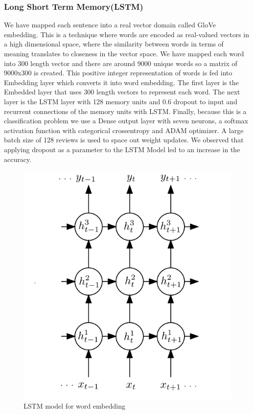 \documentclass[conference]{IEEEtran}
\numberwithin{equation}{section}
\numberwithin{figure}{section}
\numberwithin{table}{section}
\begin{document}
\subsubsection {Long Short Term Memory(LSTM)\cite{lstm}}
We have mapped each sentence into a real vector domain called GloVe embedding. This is a technique where words are encoded as real-valued vectors in a high dimensional space, where the similarity between words in terms of meaning translates to closeness in the vector space.
We have mapped each word into 300 length vector and there are around 9000 unique words so a matrix of 9000x300 is created. This positive integer representation of words is fed into Embedding layer which converts it into word embedding.
The first layer is the Embedded layer that uses 300 length vectors to represent each word. The next layer is the LSTM layer with 128 memory units and 0.6 dropout to input and recurrent connections of the memory units with LSTM. Finally, because this is a classification problem we use a Dense output layer with seven neurons, a softmax activation function with categorical crossentropy and ADAM optimizer. A large batch size of 128 reviews is used to space out weight updates.  We observed that applying dropout as a parameter to the LSTM Model led to an increase in the accuracy.
\begin{figure}
  \centering
  \includegraphics[width=\columnwidth]{LSTM_image}
  \caption{LSTM model for word embedding}
    \label{lstm}
\end{figure}
\end{document}
